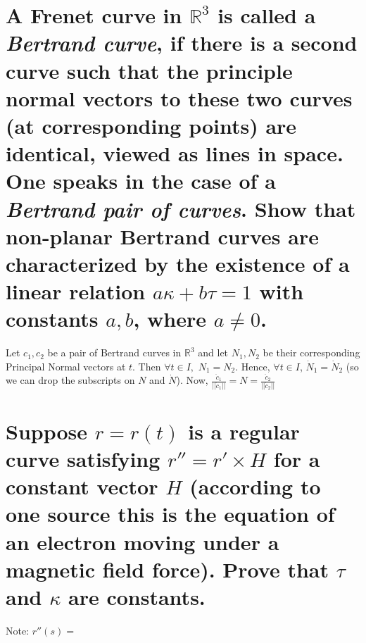 \documentclass[12pt]{amsart}
\begin{document}
\setcounter{equation}{0}
\section{A Frenet curve in $\mathbb{R}^3$ is called a \emph{Bertrand curve}, if there is a second curve such that the principle normal vectors to these two curves (at corresponding points) are identical, viewed as lines in space. One speaks in the case of a \emph{Bertrand pair of curves}. Show that non-planar Bertrand curves are characterized by the existence of a linear relation $a\kappa+b\tau=1$ with constants $a,b$, where $a\neq0$.} Let $c_1,c_2$ be a pair of Bertrand curves in $\mathbb{R}^3$ and let $N_1,N_2$ be their corresponding Principal Normal vectors at $t$. Then $\forall t\in I,$ $N_1=N_2$. Hence, $\forall t\in I$, $\dot N_1=\dot N_2$ (so we can drop the subscripts on $N$ and $\dot N$). Now, $\frac{\ddot c_1}{||\ddot c_1||}=N=\frac{\ddot c_2}{||\ddot c_2||}$
\begin{comment}Since,
\[\left(\begin{array}{c}
	T_1 \\
	N_1 \\
	B_1
\end{array} \right)' =\left(\begin{array}{ccc}
	0 & \kappa_1 & 0 \\
	-\kappa_1 & 0 & \tau_1 \\
	0 & -\tau_1 & 0
\end{array} \right)
\left(\begin{array}{c}
	T_1\\
	N_1\\
	B_1
\end{array}\right) \]
we know, $-\kappa_1T_1+\tau_1B_1=-\kappa_2T_2+\tau_2B_2$, and $\frac{T_1'}{\kappa_1}=\frac{T_2'}{\kappa_2}$
\end{comment}

\section{Suppose $r=r(t)$ is a regular curve satisfying $r''=r'\times H$ for a constant vector $H$ (according to one source this is the equation of an electron moving under a magnetic field force). Prove that $\tau$ and $\kappa$ are constants.}
Note: $r''(s)=$
\end{document}
